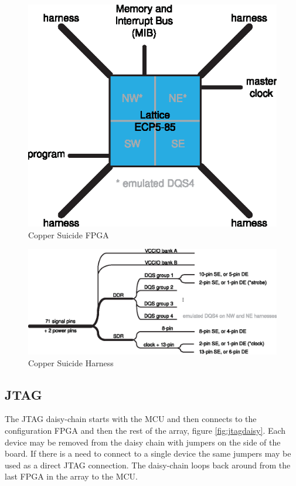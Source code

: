 \documentclass{article}
\begin{document}
\begin{figure}[H]
  \centering
  \includegraphics[scale=1]{cs_fpga.eps}
	\caption{Copper Suicide FPGA}
	\label{fig:fpga}
\end{figure}

\begin{figure}[H]
  \centering
  \includegraphics[scale=1]{cs_harness.eps}
	\caption{Copper Suicide Harness}
	\label{fig:harness}
\end{figure}




\newpage

\subsection{JTAG}

The JTAG daisy-chain starts with the MCU and then connects to the configuration FPGA and then the rest of the array, figure \ref{fig:jtagdaisy}. Each device may be removed from the daisy chain with jumpers on the side of the board. If there is a need to connect to a single device the same jumpers may be used as a direct JTAG connection. The daisy-chain loops back around from the last FPGA in the array to the MCU.
\end{document}
